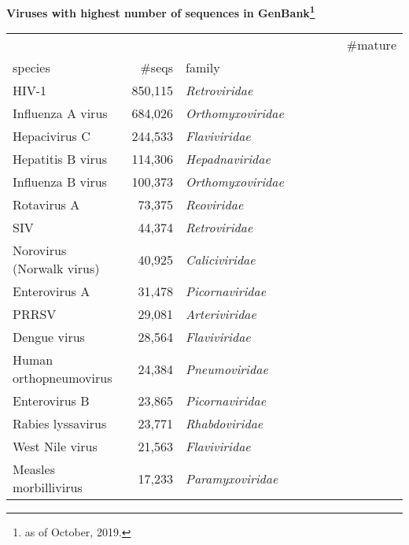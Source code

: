 \documentclass[landscape]{slides}
\begin{document}
\begin{slide}
\begin{center}

\textbf{Viruses with highest number of sequences in GenBank\footnote{as of October, 2019.}}

\tiny
\begin{tabular}{lrl}
     &                     &              &                &          &        &       & \#mature \\ 
species                   &       \#seqs & family           \\ \hline
HIV-1                     &      850,115 & \emph{Retroviridae}     \\ %
Influenza A virus         &      684,026 & \emph{Orthomyxoviridae} \\ %
Hepacivirus C             &      244,533 & \emph{Flaviviridae}     \\ %
Hepatitis B virus         &      114,306 & \emph{Hepadnaviridae}   \\ %
Influenza B virus         &      100,373 & \emph{Orthomyxoviridae} \\ %
Rotavirus A               &       73,375 & \emph{Reoviridae}       \\ %
SIV                       &       44,374 & \emph{Retroviridae}     \\ %
Norovirus (Norwalk virus) &       40,925 & \emph{Caliciviridae}    \\ %
Enterovirus A             &       31,478 & \emph{Picornaviridae}   \\ %
PRRSV                     &       29,081 & \emph{Arteriviridae}    \\ %
Dengue virus              &       28,564 & \emph{Flaviviridae}     \\ %
Human orthopneumovirus    &       24,384 & \emph{Pneumoviridae}    \\ %
Enterovirus B             &       23,865 & \emph{Picornaviridae}   \\ %
Rabies lyssavirus         &       23,771 & \emph{Rhabdoviridae}    \\ %
West Nile virus           &       21,563 & \emph{Flaviviridae}     \\ %
Measles morbillivirus     &       17,233 & \emph{Paramyxoviridae}  \\ %
\end{tabular}

\vfill

\end{center}
\end{slide}
\end{document}
